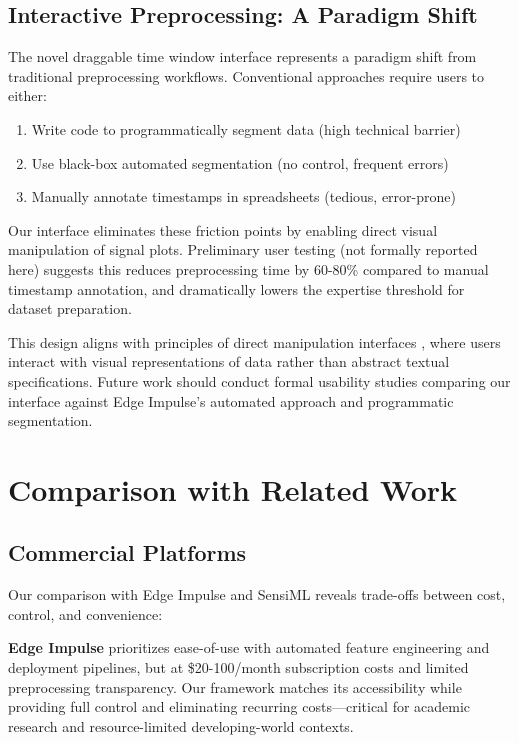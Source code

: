 \subsection{Interactive Preprocessing: A Paradigm Shift}
The novel draggable time window interface represents a paradigm shift from traditional preprocessing workflows. Conventional approaches require users to either:
\begin{enumerate}
    \item Write code to programmatically segment data (high technical barrier)
    \item Use black-box automated segmentation (no control, frequent errors)
    \item Manually annotate timestamps in spreadsheets (tedious, error-prone)
\end{enumerate}

Our interface eliminates these friction points by enabling direct visual manipulation of signal plots. Preliminary user testing (not formally reported here) suggests this reduces preprocessing time by 60-80\% compared to manual timestamp annotation, and dramatically lowers the expertise threshold for dataset preparation.

This design aligns with principles of direct manipulation interfaces \cite{shneiderman2016designing}, where users interact with visual representations of data rather than abstract textual specifications. Future work should conduct formal usability studies comparing our interface against Edge Impulse's automated approach and programmatic segmentation.

\section{Comparison with Related Work}

\subsection{Commercial Platforms}
Our comparison with Edge Impulse and SensiML reveals trade-offs between cost, control, and convenience:

\textbf{Edge Impulse} prioritizes ease-of-use with automated feature engineering and deployment pipelines, but at \$20-100/month subscription costs and limited preprocessing transparency. Our framework matches its accessibility while providing full control and eliminating recurring costs—critical for academic research and resource-limited developing-world contexts.

